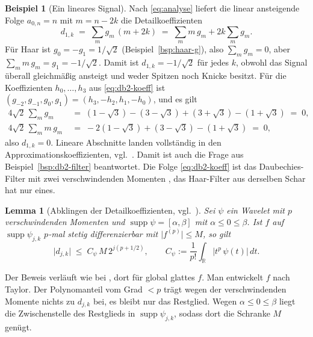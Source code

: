 \documentclass[a4paper,11pt,bibliography=totoc,listof=totoc,headinclude=true,cleardoublepage=empty,oneside]{scrbook}
\theoremstyle{plain}
\newtheorem{Lemma}[Satz]{Lemma}
\theoremstyle{definition}
\newtheorem{Beispiel}[Satz]{Beispiel}
\newcommand{\R}{\mathbb{R}}
\DeclareMathOperator{\supp}{supp}
\begin{document}
\begin{Beispiel}[Ein lineares Signal]
\label{bsp:momente}
Nach \eqref{eq:analyse} liefert die linear ansteigende Folge $a_{0,n} = n$ mit
$m = n-2k$ die Detailkoeffizienten
\[
  d_{1,k} \;=\; \sum_m g_m\,(m+2k) \;=\; \sum_m m\,g_m + 2k\sum_m g_m .
\]
Für Haar ist $g_0 = -g_1 = 1/\sqrt2$ (Beispiel~\ref{bsp:haar-g}), also
$\sum_m g_m = 0$, aber $\sum_m m\,g_m = g_1 = -1/\sqrt2$. Damit ist
$d_{1,k} = -1/\sqrt2$ für jedes $k$, obwohl das Signal überall gleichmä\ss{}ig
ansteigt und weder Spitzen noch Knicke besitzt.
Für die Koeffizienten $h_0,\dots,h_3$ aus \eqref{eq:db2-koeff} ist
$(g_{-2},g_{-1},g_0,g_1) = (h_3,-h_2,h_1,-h_0)$, und es gilt
\begin{align*}
  4\sqrt2\,\sum_m g_m &\;=\; (1-\sqrt3)-(3-\sqrt3)+(3+\sqrt3)-(1+\sqrt3) \;=\; 0,\\
  4\sqrt2\,\sum_m m\,g_m &\;=\; -2(1-\sqrt3)+(3-\sqrt3)-(1+\sqrt3) \;=\; 0,
\end{align*}
also $d_{1,k} = 0$. Lineare Abschnitte landen vollständig in den
Approximationskoeffizienten, vgl.\ \cite[Lemma~2.4.29]{lmr}. %
Damit ist auch die Frage aus Beispiel~\ref{bsp:db2-filter} beantwortet. Die
Folge \eqref{eq:db2-koeff} ist das Daubechies-Filter mit zwei verschwindenden
Momenten \cite[Kap.~6.3]{blatter}, %
das Haar-Filter aus derselben Schar hat nur eines.
\end{Beispiel}

\begin{Lemma}[Abklingen der Detailkoeffizienten, vgl.\ {\cite[Beweis von Lemma~2.4.30]{lmr}}] %
\label{lem:abklingen}
Sei $\psi$ ein Wavelet mit $p$ verschwindenden Momenten und
$\supp\psi = [\alpha,\beta]$ mit $\alpha\le0\le\beta$. Ist $f$ auf $\supp\psi_{j,k}$ $p$-mal stetig differenzierbar
mit $\lvert f^{(p)}\rvert \le M$, so gilt
\[
  \lvert d_{j,k}\rvert \;\le\; C_\psi\,M\,2^{j(p+1/2)},
  \qquad
  C_\psi := \frac{1}{p!}\int_\R \lvert t^p\,\psi(t)\rvert\,dt .
\]
\end{Lemma}

Der Beweis verläuft wie bei \cite[Beweis von Lemma~2.4.30]{lmr}, %
dort für global glattes $f$. Man entwickelt $f$ nach Taylor. Der Polynomanteil
vom Grad $<p$ trägt wegen der verschwindenden Momente nichts zu $d_{j,k}$ bei,
es bleibt nur das Restglied. Wegen $\alpha\le0\le\beta$ liegt die
Zwischenstelle des Restglieds in $\supp\psi_{j,k}$, sodass dort die Schranke
$M$ genügt.
\end{document}
